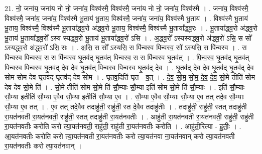 \documentclass[17pt]{extarticle}
\begin{document}
21. नो॒ जना॑य॒ जना॑य नो नो॒ जना॑य॒ विश्व॑स्मै॒ विश्व॑स्मै॒ जना॑य नो नो॒ जना॑य॒ विश्व॑स्मै । . जना॑य॒ विश्व॑स्मै॒ विश्व॑स्मै॒ जना॑य॒ जना॑य॒ विश्व॑स्मै भू॒ताय॑ भू॒ताय॒ विश्व॑स्मै॒ जना॑य॒ जना॑य॒ विश्व॑स्मै भू॒ताय॑ । . विश्व॑स्मै भू॒ताय॑ भू॒ताय॒ विश्व॑स्मै॒ विश्व॑स्मै भू॒ताया᳚द्ध्व॒रो अ॑द्ध्व॒रो भू॒ताय॒ विश्व॑स्मै॒ विश्व॑स्मै भू॒ताया᳚द्ध्व॒रः । . भू॒ताया᳚द्ध्व॒रो अ॑द्ध्व॒रो भू॒ताय॑ भू॒ताया᳚द्ध्व॒रो᳚ ऽस्य स्यद्ध्व॒रो भू॒ताय॑ भू॒ताया᳚द्ध्व॒रो॑ ऽसि । . अ॒द्ध्व॒रो᳚ ऽस्यस्यद्ध्व॒रो अ॑द्ध्व॒रो॑ ऽसि॒ स सो᳚ ऽस्यद्ध्व॒रो अ॑द्ध्व॒रो॑ ऽसि॒ सः । . अ॒सि॒ स सो᳚ ऽस्यसि॒ स पि॑न्वस्व पिन्वस्व॒ सो᳚ ऽस्यसि॒ स पि॑न्वस्व । . स पि॑न्वस्व पिन्वस्व॒ स स पि॑न्वस्व घृ॒तव॑द् घृ॒तव॑त् पिन्वस्व॒ स स पि॑न्वस्व घृ॒तव॑त् । . पि॒न्व॒स्व॒ घृ॒तव॑द् घृ॒तव॑त् पिन्वस्व पिन्वस्व घृ॒तव॑द् देव देव घृ॒तव॑त् पिन्वस्व पिन्वस्व घृ॒तव॑द् देव । . घृ॒तव॑द् देव देव घृ॒तव॑द् घृ॒तव॑द् देव सोम सोम देव घृ॒तव॑द् घृ॒तव॑द् देव सोम । . घृ॒तव॒दिति॑ घृ॒त - व॒त् । . दे॒व॒ सो॒म॒ सो॒म॒ दे॒व॒ दे॒व॒ सो॒मे तीति॑ सोम देव देव सो॒मे ति॑ । . सो॒मे तीति॑ सोम सो॒मे ति॑ सौ॒म्याः सौ॒म्या इति॑ सोम सो॒मे ति॑ सौ॒म्याः । . इति॑ सौ॒म्याः सौ॒म्या इतीति॑ सौ॒म्या ए॒वैव सौ॒म्या इतीति॑ सौ॒म्या ए॒व । . सौ॒म्या ए॒वैव सौ॒म्याः सौ॒म्या ए॒व तत् तदे॒व सौ॒म्याः सौ॒म्या ए॒व तत् । . ए॒व तत् तदे॒वैव तदाहु॑ती॒ राहु॑ती॒ स्त दे॒वैव तदाहु॑तीः । . तदाहु॑ती॒ राहु॑ती॒ स्तत् तदाहु॑ती रा॒यत॑नवती रा॒यत॑नवती॒ राहु॑ती॒ स्तत् तदाहु॑ती रा॒यत॑नवतीः । . आहु॑ती रा॒यत॑नवती रा॒यत॑नवती॒ राहु॑ती॒ राहु॑ती रा॒यत॑नवतीः करोति करो त्या॒यत॑नवती॒ राहु॑ती॒ राहु॑ती रा॒यत॑नवतीः करोति । . आहु॑ती॒रित्या - हु॒तीः॒ । . आ॒यत॑नवतीः करोति करो त्या॒यत॑नवती रा॒यत॑नवतीः करो त्या॒यत॑नवा ना॒यत॑नवान् करो त्या॒यत॑नवती रा॒यत॑नवतीः करो त्या॒यत॑नवान् । \newline
\end{document}
